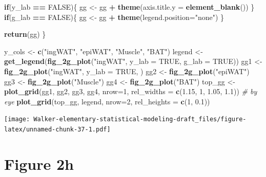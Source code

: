 \documentclass[]{book}
\newenvironment{Shaded}{\begin{snugshade}}{\end{snugshade}}
\newcommand{\CommentTok}[1]{\textcolor[rgb]{0.56,0.35,0.01}{\textit{#1}}}
\newcommand{\ControlFlowTok}[1]{\textcolor[rgb]{0.13,0.29,0.53}{\textbf{#1}}}
\newcommand{\DataTypeTok}[1]{\textcolor[rgb]{0.13,0.29,0.53}{#1}}
\newcommand{\DecValTok}[1]{\textcolor[rgb]{0.00,0.00,0.81}{#1}}
\newcommand{\FloatTok}[1]{\textcolor[rgb]{0.00,0.00,0.81}{#1}}
\newcommand{\KeywordTok}[1]{\textcolor[rgb]{0.13,0.29,0.53}{\textbf{#1}}}
\newcommand{\NormalTok}[1]{#1}
\newcommand{\OperatorTok}[1]{\textcolor[rgb]{0.81,0.36,0.00}{\textbf{#1}}}
\newcommand{\OtherTok}[1]{\textcolor[rgb]{0.56,0.35,0.01}{#1}}
\newcommand{\StringTok}[1]{\textcolor[rgb]{0.31,0.60,0.02}{#1}}
\begin{document}
\begin{Shaded}
\begin{Highlighting}[]
  \ControlFlowTok{if}\NormalTok{(y_lab }\OperatorTok{==}\StringTok{ }\OtherTok{FALSE}\NormalTok{)\{}
\NormalTok{    gg <-}\StringTok{ }\NormalTok{gg }\OperatorTok{+}\StringTok{ }\KeywordTok{theme}\NormalTok{(}\DataTypeTok{axis.title.y =} \KeywordTok{element_blank}\NormalTok{())}
\NormalTok{  \}}
  \ControlFlowTok{if}\NormalTok{(g_lab }\OperatorTok{==}\StringTok{ }\OtherTok{FALSE}\NormalTok{)\{}
\NormalTok{    gg <-}\StringTok{ }\NormalTok{gg }\OperatorTok{+}\StringTok{ }\KeywordTok{theme}\NormalTok{(}\DataTypeTok{legend.position=}\StringTok{"none"}\NormalTok{)}
\NormalTok{  \}}
  
  \KeywordTok{return}\NormalTok{(gg)}
\NormalTok{\}}

\NormalTok{y_cols <-}\StringTok{ }\KeywordTok{c}\NormalTok{(}\StringTok{"ingWAT"}\NormalTok{, }\StringTok{"epiWAT"}\NormalTok{, }\StringTok{"Muscle"}\NormalTok{, }\StringTok{"BAT"}\NormalTok{)}
\NormalTok{legend <-}\StringTok{ }\KeywordTok{get_legend}\NormalTok{(}\KeywordTok{fig_2g_plot}\NormalTok{(}\StringTok{"ingWAT"}\NormalTok{, }\DataTypeTok{y_lab =} \OtherTok{TRUE}\NormalTok{, }\DataTypeTok{g_lab =} \OtherTok{TRUE}\NormalTok{))}
\NormalTok{gg1 <-}\StringTok{ }\KeywordTok{fig_2g_plot}\NormalTok{(}\StringTok{"ingWAT"}\NormalTok{, }\DataTypeTok{y_lab =} \OtherTok{TRUE}\NormalTok{, )}
\NormalTok{gg2 <-}\StringTok{ }\KeywordTok{fig_2g_plot}\NormalTok{(}\StringTok{"epiWAT"}\NormalTok{)}
\NormalTok{gg3 <-}\StringTok{ }\KeywordTok{fig_2g_plot}\NormalTok{(}\StringTok{"Muscle"}\NormalTok{)}
\NormalTok{gg4 <-}\StringTok{ }\KeywordTok{fig_2g_plot}\NormalTok{(}\StringTok{"BAT"}\NormalTok{)}
\NormalTok{top_gg <-}\StringTok{ }\KeywordTok{plot_grid}\NormalTok{(gg1, gg2, gg3, gg4,}
                       \DataTypeTok{nrow=}\DecValTok{1}\NormalTok{,}
                       \DataTypeTok{rel_widths =} \KeywordTok{c}\NormalTok{(}\FloatTok{1.15}\NormalTok{, }\DecValTok{1}\NormalTok{, }\FloatTok{1.05}\NormalTok{, }\FloatTok{1.1}\NormalTok{)) }\CommentTok{# by eye}
\KeywordTok{plot_grid}\NormalTok{(top_gg, legend,}
          \DataTypeTok{nrow=}\DecValTok{2}\NormalTok{,}
          \DataTypeTok{rel_heights =} \KeywordTok{c}\NormalTok{(}\DecValTok{1}\NormalTok{, }\FloatTok{0.1}\NormalTok{))}
\end{Highlighting}
\end{Shaded}

\texttt{[image: Walker-elementary-statistical-modeling-draft\_files/figure-latex/unnamed-chunk-37-1.pdf]}

\hypertarget{figure-2h}{%
\section{Figure 2h}\label{figure-2h}}
\end{document}
